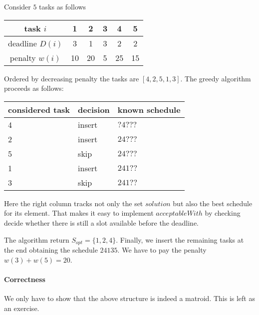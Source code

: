 \begin{example}
Consider $5$ tasks as follows
\begin{center}
\begin{tabular}{c|ccccc}
task $i$ & 1 & 2 & 3 & 4 & 5 \\
\hline
deadline $D(i)$ & 3 & 1 & 3 & 2 & 2 \\
penalty $w(i)$ & 10 & 20 & 5 & 25 & 15
\end{tabular}
\end{center}

Ordered by decreasing penalty the tasks are $[4,2,5,1,3]$.
The greedy algorithm proceeds as follows:
\begin{center}
\begin{tabular}{|lll|}
\hline
considered task & decision & known schedule \\
\hline
4 & insert & $?4???$ \\
2 & insert & $24???$ \\
5 & skip   & $24???$ \\
1 & insert & $241??$ \\
3 & skip   & $241??$ \\
\hline
\end{tabular}
\end{center}
Here the right column tracks not only the set $solution$ but also the best schedule for its element.
That makes it easy to implement $acceptableWith$ by checking decide whether there is still a slot available before the deadline.

The algorithm return $S_{opt}=\{1,2,4\}$.
Finally, we insert the remaining tasks at the end obtaining the schedule $24135$.
We have to pay the penalty $w(3)+w(5)=20$.
\end{example}


\paragraph{Correctness}
We only have to show that the above structure is indeed a matroid.
This is left as an exercise.

